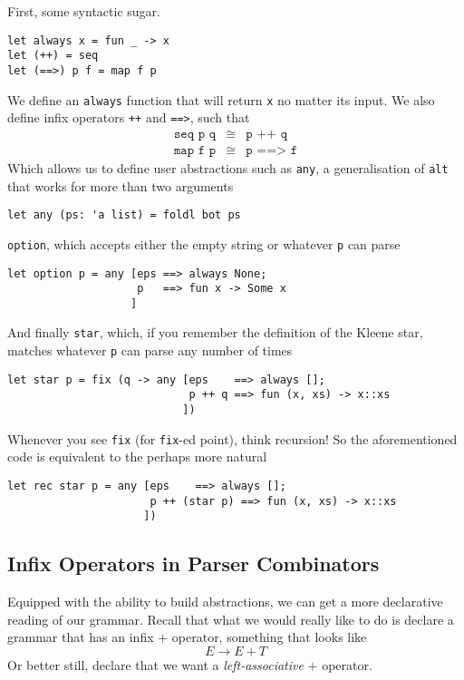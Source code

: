 First, some syntactic sugar.
\begin{verbatim}
let always x = fun _ -> x
let (++) = seq
let (==>) p f = map f p
\end{verbatim}
We define an \texttt{always} function that will return \texttt{x} no matter its input. We also define infix operators \texttt{++} and \texttt{==>}, such that 
\[
\begin{array}{rcl}
\texttt{seq p q} &\cong& \texttt{p ++ q}\\
\texttt{map f p}&\cong&\texttt{p ==> f}
\end{array}
\]
Which allows us to define user abstractions such as \texttt{any}, a generalisation of \texttt{alt} that works for more than two arguments
\begin{verbatim}
let any (ps: 'a list) = foldl bot ps
\end{verbatim}
\texttt{option}, which accepts either the empty string or whatever \texttt{p} can parse
\begin{verbatim}
let option p = any [eps ==> always None;
                    p   ==> fun x -> Some x
                   ]
\end{verbatim}
And finally \texttt{star}, which, if you remember the definition of the Kleene star, matches whatever \texttt{p} can parse any number of times
\begin{verbatim}
let star p = fix (q -> any [eps    ==> always [];
                            p ++ q ==> fun (x, xs) -> x::xs
                           ])
\end{verbatim}
Whenever you see \texttt{fix} (for \texttt{fix}-ed point), think recursion! So the aforementioned code is equivalent to the perhaps more natural
\begin{verbatim}
let rec star p = any [eps    ==> always [];
                      p ++ (star p) ==> fun (x, xs) -> x::xs
                     ])
\end{verbatim}
\subsection{Infix Operators in Parser Combinators}
Equipped with the ability to build abstractions, we can get a more declarative reading of our grammar. Recall that what we would really like to do is declare a grammar that has an infix $+$ operator, something that looks like 
\[ E \rightarrow E + T\]
Or better still, declare that we want a \textit{left-associative} $+$ operator.


